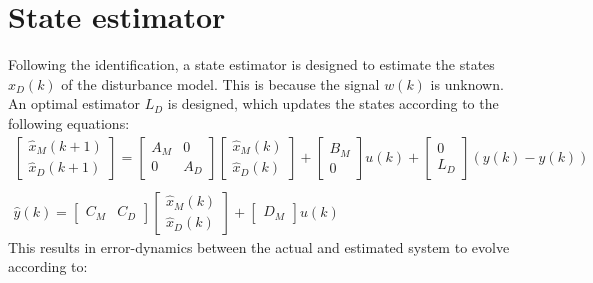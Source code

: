\documentclass[a4paper]{article}
\begin{document}
\section{State estimator}
Following the identification, a state estimator is designed to estimate the states $x_D(k)$ of the disturbance model. This is because the signal $w(k)$ is unknown. An optimal estimator $L_D$ is designed, which updates the states according to the following equations:
\begin{equation}
\begin{matrix}
\begin{bmatrix}
\hat{x}_M(k+1) \\ \hat{x}_D(k+1)
\end{bmatrix}
=
\begin{bmatrix}
A_M & 0 \\
0 & A_D
\end{bmatrix}
\begin{bmatrix}
\hat{x}_M(k) \\ \hat{x}_D(k)
\end{bmatrix}
+
\begin{bmatrix}
B_M \\ 0
\end{bmatrix}u(k)
+
\begin{bmatrix}
0 \\ L_D
\end{bmatrix}(y(k)-\hat{y}(k)) \\ \\
\hat{y}(k) = 
\begin{bmatrix}
C_M & C_D
\end{bmatrix}
\begin{bmatrix}
\hat{x}_M(k) \\ \hat{x}_D(k)
\end{bmatrix}
+
\begin{bmatrix}
D_M 
\end{bmatrix}u(k)
\end{matrix}
\label{estimator_model}
\end{equation}
This results in error-dynamics between the actual and estimated system to evolve according to:
\end{document}
